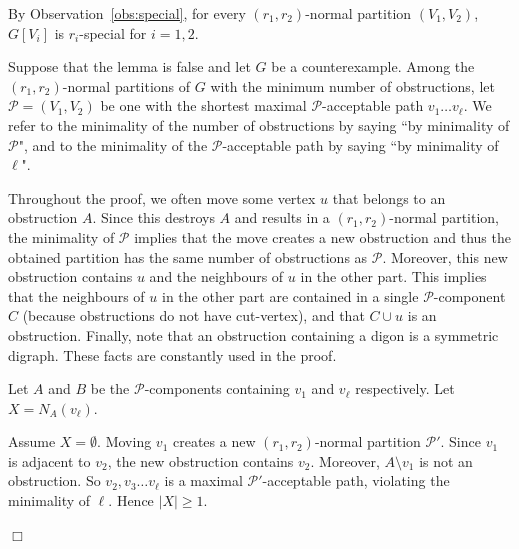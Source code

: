 \documentclass[11pt]{article}
\newcommand{\mc}{\mathcal}
\newcounter{claim}
\newenvironment{proof}[1][]%
 {\noindent {\setcounter{claim}{0}\sc proof ---
   }{#1}{}}{\hfill$\Box$\vspace{2ex}}
\begin{document}
\begin{proof}
By Observation~\ref{obs:special}, for every $(r_1,r_2)$-normal partition $(V_1, V_2)$, $G[V_i]$ is $r_i$-special for $i=1, 2$. 

Suppose that the lemma is false and let $G$ be a counterexample.  Among the $(r_1, r_2)$-normal partitions of $G$ with the minimum number of obstructions, let $\mc P = (V_1, V_2)$ be one with the shortest maximal $\mc P$-acceptable path $v_{1}\dots v_{\ell}$. 
We refer to the minimality of the number of obstructions by saying ``by minimality of $\mc P$", and to the minimality of the $\mc P$-acceptable path by saying ``by minimality of $\ell$". 


Throughout the proof, we often move some vertex $u$ that belongs to an  obstruction $A$. 
Since this destroys $A$ and results in a $(r_1,r_2)$-normal partition, the minimality of $\mc P$  implies that the move creates a new obstruction and thus the obtained partition has the same number of obstructions as $\mc P$. 
Moreover, this new obstruction  contains $u$  and  the neighbours of $u$ in the other part. This implies that the neighbours of $u$ in the other part are contained in a single $\mc P$-component $C$ (because obstructions do not have cut-vertex),   and that $C \cup u$ is an obstruction. Finally, note that an obstruction containing a digon is a symmetric digraph. 
These facts are constantly used in the proof. 

Let $A$ and $B$ be the $\mc P$-components containing $v_{1}$ and $v_{\ell}$ respectively. 
Let $X=N_{A}(v_{\ell})$. 
\medskip 

Assume  $X= \emptyset$. 
Moving $v_{1}$ creates a new $(r_1, r_2)$-normal partition $\mc P'$. Since $v_{1}$ is adjacent to $v_{2}$, the new obstruction contains $v_{2}$. Moreover, $A \setminus v_{1}$ is not an obstruction. So $v_{2}, v_{3} \dots v_{\ell}$ is a maximal $\mc P'$-acceptable path, violating the minimality of $\ell$. Hence $|X| \geq 1$.
\medskip 

\begin{figure}[ht]
    \centering
\end{figure}
\end{proof}
\end{document}
